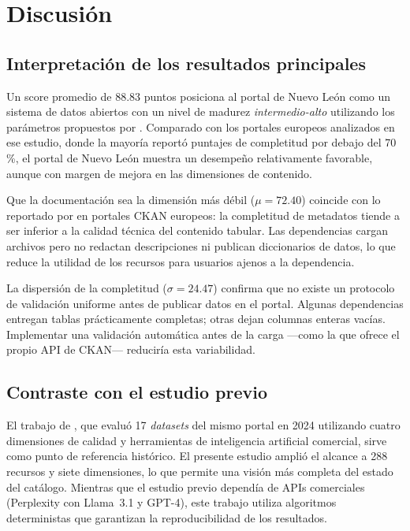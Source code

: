 \documentclass[12pt,letterpaper]{article}
\begin{document}
\section{Discusi\'on}

\subsection{Interpretaci\'on de los resultados principales}

Un score promedio de 88.83 puntos posiciona al portal de Nuevo Le\'on como un sistema
de datos abiertos con un nivel de madurez \textit{intermedio-alto} utilizando los
par\'ametros propuestos por \textcite{vetro2016}. Comparado con los portales europeos
analizados en ese estudio, donde la mayor\'ia report\'o puntajes de completitud por
debajo del 70\,\%, el portal de Nuevo Le\'on muestra un desempe\~no relativamente
favorable, aunque con margen de mejora en las dimensiones de contenido.

Que la documentaci\'on sea la dimensi\'on m\'as d\'ebil ($\mu = 72.40$) coincide
con lo reportado por \textcite{neumaier2016} en portales CKAN europeos: la
completitud de metadatos tiende a ser inferior a la calidad t\'ecnica del
contenido tabular. Las dependencias cargan archivos pero no redactan
descripciones ni publican diccionarios de datos, lo que reduce la utilidad
de los recursos para usuarios ajenos a la dependencia.

La dispersi\'on de la completitud ($\sigma = 24.47$) confirma que no existe
un protocolo de validaci\'on uniforme antes de publicar datos en el portal.
Algunas dependencias entregan tablas pr\'acticamente completas; otras dejan
columnas enteras vac\'ias. Implementar una validaci\'on autom\'atica antes de
la carga ---como la que ofrece el propio API de CKAN--- reducir\'ia esta
variabilidad.

\subsection{Contraste con el estudio previo}

El trabajo de \textcite{alanis2024}, que evalu\'o 17 \textit{datasets} del mismo portal
en 2024 utilizando cuatro dimensiones de calidad y herramientas de inteligencia
artificial comercial, sirve como punto de referencia hist\'orico. El presente estudio
ampli\'o el alcance a 288 recursos y siete dimensiones, lo que permite una visi\'on m\'as
completa del estado del cat\'alogo. Mientras que el estudio previo depend\'ia de APIs
comerciales (Perplexity con Llama~3.1 y GPT-4), este trabajo utiliza algoritmos
deterministas que garantizan la reproducibilidad de los resultados.
\end{document}
